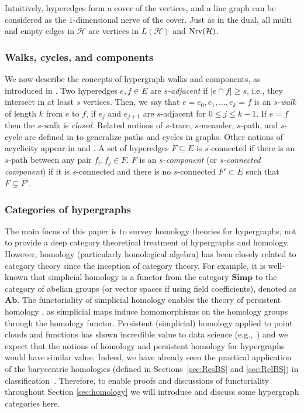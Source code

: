 \documentclass{amsart}
\newcommand{\Simp}{\mathrm{\textbf{Simp}}}
\newcommand{\Ab}{\mathrm{\textbf{Ab}}}
\renewcommand{\H}{\mathcal{H}}
\newcommand{\Nrv}{\mm{\mathrm{Nrv}}}
\newcommand {\mm}[1]        {\ifmmode{#1}\else{\mbox{\(#1\)}}\fi}
\begin{document}
Intuitively, hyperedges form a cover of the vertices, and a line graph can be considered as the $1$-dimensional nerve of the cover.
Just as in the dual, all multi and empty edges in $\H$ are vertices in $L(\H)$ and $\Nrv(\H)$.

\subsubsection{Walks, cycles, and components}
We now describe the concepts of hypergraph walks and components, as introduced in \cite[Def. 5]{aksoy_hypernetwork_2020}.
Two hyperedges $e, f \in E$ are \emph{$s$-adjacent} if $|e \cap f| \geq s$, i.e., they intersect in at least $s$ vertices.
Then, we say that $e=e_{0}, e_{1}, \ldots, e_{k}=f$ is an \emph{$s$-walk} of length $k$ from $e$ to $f$, if $e_{j}$ and $e_{j+1}$ are $s$-adjacent for $0 \leq j\leq k-1$.
If $e=f$ then the $s$-walk is \emph{closed}.
Related notions of $s$-trace, $s$-meander, $s$-path, and $s$-cycle are defined in \cite{aksoy_hypernetwork_2020} to generalize paths and cycles in graphs.
Other notions of acyclicity appear in \cite{berge1984hypergraphs} and \cite{fagin1983degrees}.
A set of hyperedges $F \subseteq E$ is $s$-connected if there is an $s$-path between any pair $f_i, f_j \in F$.
$F$ is an \emph{$s$-component} (or \emph{$s$-connected component}) if it is $s$-connected and there is no $s$-connected $F' \subset E$ such that $F \subsetneq F'$.

\subsubsection{Categories of hypergraphs}
\label{sec:categories}

The main focus of this paper is to survey homology theories for hypergraphs, not to provide a deep category theoretical treatment of hypergraphs and homology.
However, homology (particularly homological algebra) has been closely related to category theory since the inception of category theory. For example, it is well-known that simplicial homology is a functor from the category $\Simp$ to the category of abelian groups (or vector spaces if using field coefficients), denoted as $\Ab$. The functoriality of simplicial homology enables the theory of persistent homology \cite{EdelsbrunnerLetscherZomorodian2002}, as simplicial maps induce homomorphisms on the homology groups through the homology functor.
Persistent (simplicial) homology applied to point clouds and functions has shown incredible value to data science (e.g.,~\cite{CarlssonVejdemo-Johansson2021,YanMasoodSridharamurthy2021}) and we expect that the notions of homology and persistent homology for hypergraphs would have similar value.
Indeed, we have already seen the practical application of the barycentric homologies (defined in Sections~\ref{sec:ResBS} and \ref{sec:RelBS}) in classification~\cite{aktas2023hypergraph}.
Therefore, to enable proofs and discussions of functoriality throughout Section \ref{sec:homology} we will introduce and discuss some hypergraph categories here.
\end{document}
